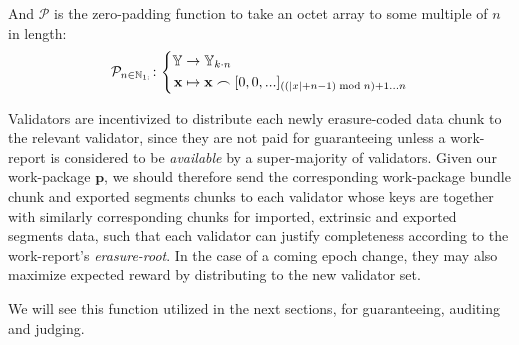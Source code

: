 And $\mathcal{P}$ is the zero-padding function to take an octet array to some multiple of $n$ in length:
\begin{equation}\label{eq:zeropadding}
  \mathcal{P}_{n \in \N_{1:}}\colon\left\{\begin{aligned}
    \Y &\to \Y_{k\cdot n}\\
    \mathbf{x} &\mapsto \mathbf{x} \concat [0, 0, ...]_{((|x|+n - 1) \bmod n) + 1 \dots n}
  \end{aligned}\right.
\end{equation}

Validators are incentivized to distribute each newly erasure-coded data chunk to the relevant validator, since they are not paid for guaranteeing unless a work-report is considered to be \emph{available} by a super-majority of validators. Given our work-package $\mathbf{p}$, we should therefore send the corresponding work-package bundle chunk and exported segments chunks to each validator whose keys are together with similarly corresponding chunks for imported, extrinsic and exported segments data, such that each validator can justify completeness according to the work-report's \emph{erasure-root}. In the case of a coming epoch change, they may also maximize expected reward by distributing to the new validator set.

We will see this function utilized in the next sections, for guaranteeing, auditing and judging.

\undef{\newavailabilityspecifier}
\undef{\itemtoresult}
\undef{\countupexports}
\undef{\importsegmentdata}
\undef{\pagedproofs}
\undef{\marshallrefine}
\undef{\extrinsicdata}
